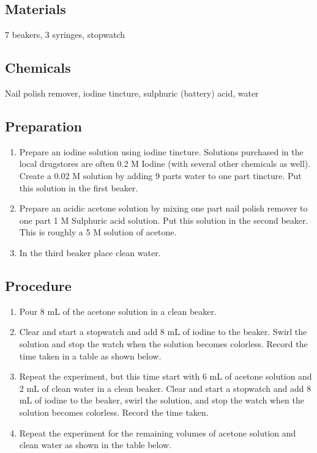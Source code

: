 \subsection{Materials}
7 beakers, 3 syringes, stopwatch

\subsection{Chemicals}
Nail polish remover, iodine tincture, sulphuric (battery) acid, water

\subsection{Preparation}
\begin{enumerate}
\item Prepare an iodine solution using iodine tincture. Solutions purchased in the local drugstores are often 0.2 M Iodine (with several other chemicals as well). Create a 0.02 M solution by adding 9 parts water to one part tincture. Put this solution in the first beaker.
\item Prepare an acidic acetone solution by mixing one part nail polish remover to one part 1 M Sulphuric acid solution. Put this solution in the second beaker. This is roughly a 5 M solution of acetone.
\item In the third beaker place clean water.
\end{enumerate}

\subsection{Procedure}
\begin{enumerate}
\item Pour 8 mL of the acetone solution in a clean beaker. 
\item Clear and start a stopwatch and add 8 mL of iodine to the beaker. Swirl the solution and stop the watch when the solution becomes colorless. Record the time taken in a table as shown below.
\item  Repeat the experiment, but this time start with 6 mL of acetone solution and 2 mL of clean water in a clean beaker. Clear and start a stopwatch and add 8 mL of iodine to the beaker, swirl the solution, and stop the watch when the solution becomes colorless. Record the time taken.
\item Repeat the experiment for the remaining volumes of acetone solution and clean water as shown in the table below.
\end{enumerate}

